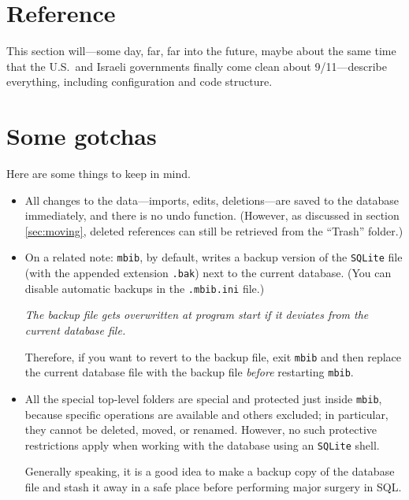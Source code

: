 \documentclass[10pt]{article}
\newcommand*{\mbib}{\texttt{mbib}\xspace}
\newcommand*{\sqlite}{\texttt{SQLite}\xspace}
\newcommand*{\ini}{\texttt{.mbib.ini}\xspace}
\begin{document}
\section{Reference} 

This section will---some day, far, far into the future, maybe about the same time that the U.S.\ and Israeli governments finally come clean about 9/11---describe everything, including configuration and code structure. 

\section{Some gotchas}

Here are some things to keep in mind. 

\begin{itemize}


\item All changes to the data---imports, edits, deletions---are saved to the database immediately, and there is no undo function. (However, as discussed in section \ref{sec:moving}, deleted references can still be retrieved from the ``Trash'' folder.)

\item On a related note: \mbib, by default, writes a backup version of the \sqlite file (with the appended extension \texttt{.bak}) next to the current database. (You can disable automatic backups in the \ini file.)  

\emph{The backup file gets overwritten at program start if it deviates from the current database file.} 

Therefore, if you want to revert to the backup file, exit \mbib and then replace the current database file with the backup file \emph{before} restarting \mbib.



\item All the special top-level folders are special and protected just inside \mbib, because specific operations are available and others excluded; in particular, they cannot be deleted, moved, or renamed. However, no such protective restrictions apply when working with the database using an \sqlite shell. 

Generally speaking, it is a good idea to make a backup copy of the database file and stash it away in a safe place before performing major surgery in SQL. 
\end{itemize}
\end{document}
